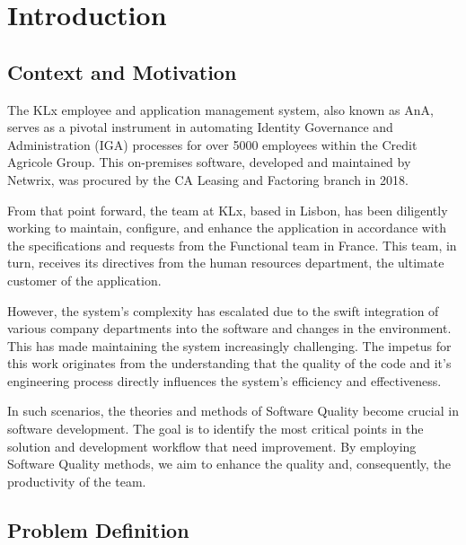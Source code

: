 
%

\chapter{Introduction}
\label{cha:introduction}


\section{Context and Motivation}
    
The KLx employee and application management system, also known as AnA, serves as a pivotal instrument in automating Identity Governance and Administration (IGA) processes for over 5000 employees within the Credit Agricole Group. This on-premises software, developed and maintained by Netwrix, was procured by the CA Leasing and Factoring branch in 2018.

From that point forward, the team at KLx, based in Lisbon, has been diligently working to maintain, configure, and enhance the application in accordance with the specifications and requests from the Functional team in France. This team, in turn, receives its directives from the human resources department, the ultimate customer of the application.

However, the system’s complexity has escalated due to the swift integration of various company departments into the software and changes in the environment. This has made maintaining the system increasingly challenging. The impetus for this work originates from the understanding that the quality of the code and it's engineering process directly influences the system’s efficiency and effectiveness.

In such scenarios, the theories and methods of Software Quality become crucial in software development. The goal is to identify the most critical points in the solution and development workflow that need improvement. By employing Software Quality methods, we aim to enhance the quality and, consequently, the productivity of the team.

\section{Problem Definition}

